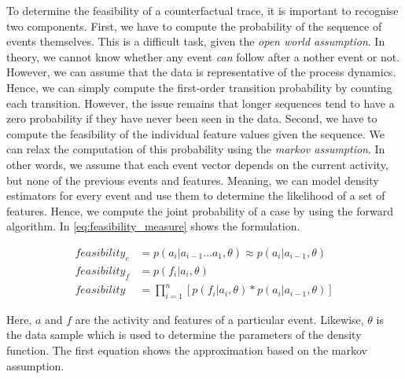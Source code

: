\documentclass[./../../paper.tex]{subfiles}
\begin{document}
To determine the feasibility of a counterfactual trace, it is important to recognise two components. First, we have to compute the probability of the sequence of events themselves. This is a difficult task, given the \emph{open world assumption}. In theory, we cannot know whether any event \emph{can} follow after a nother event or not. However, we can assume that the data is representative of the process dynamics. Hence, we can simply compute the first-order transition probability by counting each transition. However, the issue remains that longer sequences tend to have a zero probability if they have never been seen in the data. 
Second, we have to compute the feasibility of the individual feature values given the sequence. We can relax the computation of this probability using the \emph{markov assumption}. In other words, we assume that each event vector depends on the current activity, but none of the previous events and features. Meaning, we can model density estimators for every event and use them to determine the likelihood of a set of features. Hence, we compute the joint probability of a case by using the forward algorithm. In \autoref{eq:feasibility_measure} shows the formulation. 

\begin{align}
    \label{eq:feasibility_measure}
    feasibility_e & =p(a_i|a_{i-1} \ldots a_1, \theta) \approx  p(a_i|a_{i-1}, \theta) \nonumber\\ 
    feasibility_f & =p(f_i|a_i, \theta) \nonumber\\
    feasibility & = \prod_{i=1}^{n}\left[p(f_i|a_i, \theta) * p(a_i|a_{i-1}, \theta)\right] 
\end{align}

\noindent Here, $a \text{ and } f$ are the activity and features of a particular event. Likewise, $\theta$ is the data sample which is used to determine the parameters of the density function. The first equation shows the approximation based on the markov assumption. 
\end{document}
